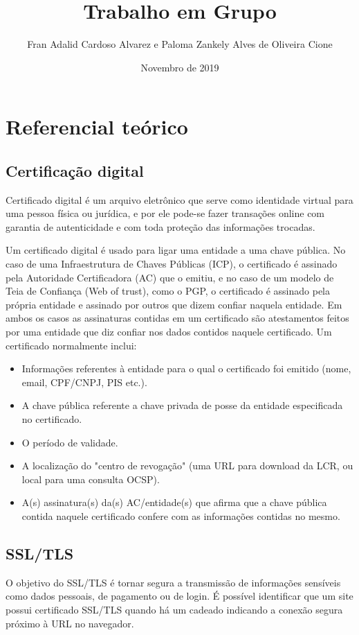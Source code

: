 \documentclass{article}
\title{Trabalho em Grupo}
\author{Fran Adalid Cardoso Alvarez e Paloma Zankely Alves de Oliveira Cione}
\date{Novembro de 2019}
\begin{document}
\maketitle

\section{Referencial teórico}
\subsection{Certificação digital}
Certificado digital é um arquivo eletrônico que serve como identidade virtual para uma pessoa física ou jurídica, e por ele pode-se fazer transações online com garantia de autenticidade e com toda proteção das informações trocadas.

Um certificado digital é usado para ligar uma entidade a uma chave pública. No caso de uma Infraestrutura de Chaves Públicas (ICP), o certificado é assinado pela Autoridade Certificadora (AC) que o emitiu, e no caso de um modelo de Teia de Confiança (Web of trust), como o PGP, o certificado é assinado pela própria entidade e assinado por outros que dizem confiar naquela entidade. Em ambos os casos as assinaturas contidas em um certificado são atestamentos feitos por uma entidade que diz confiar nos dados contidos naquele certificado. 
Um certificado normalmente inclui:
\begin{itemize}
\item{Informações referentes à entidade para o qual o certificado foi emitido (nome, email, CPF/CNPJ, PIS etc.).}
\item{A chave pública referente a chave privada de posse da entidade especificada no certificado.}
\item{O período de validade.}
\item{A localização do "centro de revogação" (uma URL para download da LCR, ou local para uma consulta OCSP).}
\item{A(s) assinatura(s) da(s) AC/entidade(s) que afirma que a chave pública contida naquele certificado confere com as informações contidas no mesmo.}
\end{itemize}
\subsection{SSL/TLS}
O objetivo do SSL/TLS é tornar segura a transmissão de informações sensíveis como dados pessoais, de pagamento ou de login. É possível identificar que um site possui certificado SSL/TLS quando há um cadeado indicando a conexão segura próximo à URL no navegador.
\end{document}
